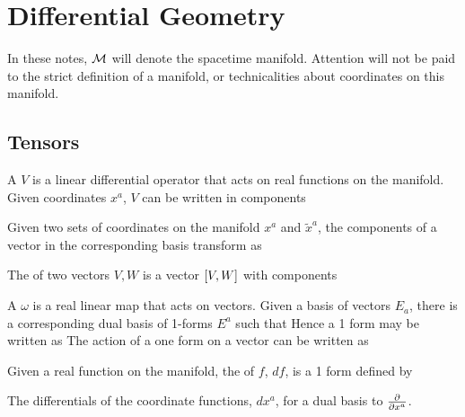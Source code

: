 \documentclass{article}
\begin{document}
\section{Differential Geometry}
In these notes, $\mc{M}$ will denote the spacetime manifold. Attention will not be paid to the strict definition of a manifold, or technicalities about coordinates on this manifold. 
\subsection{Tensors}
\begin{definition}[Vectors]
A  $V$ is a linear differential operator that acts on real functions on the manifold. Given coordinates $x^a$, $V$ can be written in components
\end{definition}

\begin{lemma}
Given two sets of coordinates on the manifold $x^a$ and $\tilde{x}^a$, the components of a vector in the corresponding basis transform as 
\end{lemma}

\begin{definition}[Commutator]
The  of two vectors $V,W$ is a vector $\comm[V]{W}$ with components 
\end{definition}

\begin{definition}
A  $\omega$ is a real linear map that acts on vectors. Given a basis of vectors $E_a$, there is a corresponding dual basis of 1-forms $E^a$ such that 
Hence a 1 form may be written as 
The action of a one form on a vector can be written as 
\end{definition}

\begin{definition}[Differential]
Given a real function on the manifold, the  of $f$, $df$, is a 1 form defined by 
\end{definition}

\begin{lemma}
The differentials of the coordinate functions, $dx^a$, for a dual basis to $\pd{x^a}$. 
\end{lemma}
\end{document}

